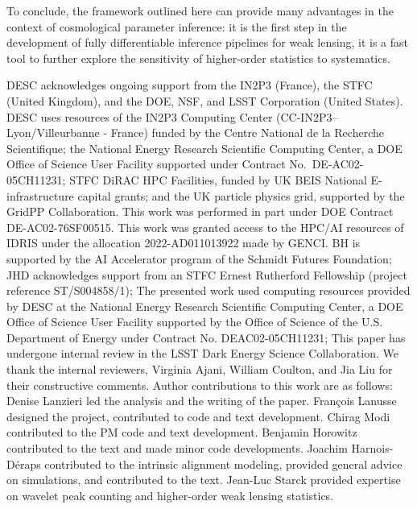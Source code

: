 \documentclass{aa}
\begin{document}
To conclude, the framework outlined here can provide many advantages in the context of cosmological parameter inference:  it is the first step in the development of fully differentiable inference pipelines for weak lensing, it is a fast tool to further explore the sensitivity of higher-order statistics to systematics. 

\begin{acknowledgements}

DESC acknowledges ongoing support from the IN2P3 (France), the STFC 
(United Kingdom), and the DOE, NSF, and LSST Corporation (United States).  
DESC uses resources of the IN2P3 Computing Center 
(CC-IN2P3--Lyon/Villeurbanne - France) funded by the Centre National de la
Recherche Scientifique; the National Energy Research Scientific Computing
Center, a DOE Office of Science User Facility supported under Contract 
No.\ DE-AC02-05CH11231; STFC DiRAC HPC Facilities, funded by UK BEIS National 
E-infrastructure capital grants; and the UK particle physics grid, supported
by the GridPP Collaboration.  This work was performed in part under DOE 
Contract DE-AC02-76SF00515.
This work was granted access to the HPC/AI resources of IDRIS under the allocation 2022-AD011013922 made by GENCI.
BH is supported by the AI Accelerator program of the Schmidt Futures Foundation; JHD acknowledges support from an STFC Ernest Rutherford Fellowship (project reference ST/S004858/1); The presented work used computing resources provided by DESC at the National Energy Research Scientific Computing Center, a DOE Office of Science User Facility supported by the Office of Science of the U.S. Department of Energy under Contract No. DEAC02-05CH11231; 
This paper has undergone internal review in the LSST Dark Energy Science Collaboration. We thank the internal reviewers, Virginia Ajani, William Coulton, and Jia Liu for their constructive comments.
Author contributions to this work are as follows: Denise Lanzieri led the analysis and the writing of the paper. Fran\c{c}ois Lanusse designed the project, contributed to code and text development.
Chirag Modi contributed to the PM code and text development.
Benjamin Horowitz contributed to the text and made minor code developments. Joachim Harnois-Déraps contributed to the intrinsic alignment modeling, provided general advice on simulations, and contributed to the text.
Jean-Luc Starck provided expertise on wavelet peak counting and higher-order weak lensing statistics. 
\end{acknowledgements}
\end{document}
